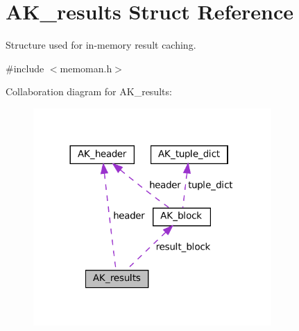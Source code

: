 \hypertarget{structAK__results}{}\section{A\+K\+\_\+results Struct Reference}
\label{structAK__results}


Structure used for in-\/memory result caching.  




{\ttfamily \#include $<$memoman.\+h$>$}



Collaboration diagram for A\+K\+\_\+results\+:\nopagebreak
\begin{figure}[H]
\begin{center}
\leavevmode
\includegraphics[width=257pt]{structAK__results__coll__graph}
\end{center}
\end{figure}
